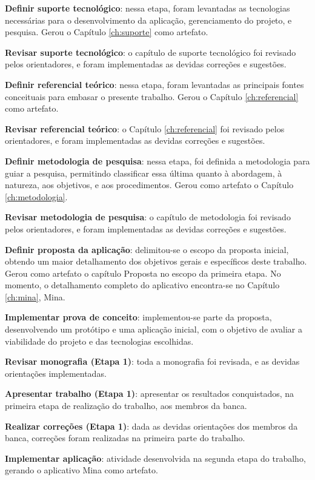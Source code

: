 \textbf{Definir suporte tecnológico}: nessa etapa, foram levantadas as tecnologias necessárias para o desenvolvimento da 
aplicação, gerenciamento do projeto, e pesquisa. Gerou o Capítulo \ref{ch:suporte} como artefato.

\textbf{Revisar suporte tecnológico}: o capítulo de suporte tecnológico foi revisado pelos orientadores, e foram implementadas as devidas correções e sugestões.

\textbf{Definir referencial teórico}: nessa etapa, foram levantadas as principais fontes conceituais para embasar o presente trabalho. Gerou o Capítulo \ref{ch:referencial} como artefato.

\textbf{Revisar referencial teórico}: o Capítulo \ref{ch:referencial} foi revisado pelos orientadores, e foram implementadas as devidas correções e sugestões.

\textbf{Definir metodologia de pesquisa}: nessa etapa, foi definida a metodologia 
para guiar a pesquisa, permitindo classificar essa última quanto
à abordagem, à natureza, aos objetivos, e aos procedimentos. Gerou como artefato o Capítulo \ref{ch:metodologia}.

\textbf{Revisar metodologia de pesquisa}: o capítulo de metodologia foi revisado pelos orientadores, e foram implementadas as devidas correções e sugestões.

\textbf{Definir proposta da aplicação}: delimitou-se o escopo da proposta inicial, obtendo um maior detalhamento 
dos objetivos gerais e específicos deste trabalho. Gerou como artefato o capítulo Proposta no 
escopo da primeira etapa. No momento, o detalhamento completo do aplicativo encontra-se no Capítulo \ref{ch:mina}, Mina.

\textbf{Implementar prova de conceito}: implementou-se parte da proposta, desenvolvendo um protótipo e uma aplicação inicial, com o objetivo 
de avaliar a viabilidade do projeto e das tecnologias escolhidas.

\textbf{Revisar monografia (Etapa 1)}: toda a monografia foi revisada, e as devidas orientações implementadas.
 
\textbf{Apresentar trabalho (Etapa 1)}: apresentar os resultados conquistados, na primeira etapa 
de realização do trabalho, aos membros da banca.

\textbf{Realizar correções (Etapa 1)}: dada as devidas orientações dos membros da banca, correções 
foram realizadas na primeira parte do trabalho.

\textbf{Implementar aplicação}: atividade desenvolvida na segunda etapa do trabalho, 
gerando o aplicativo Mina como artefato.

